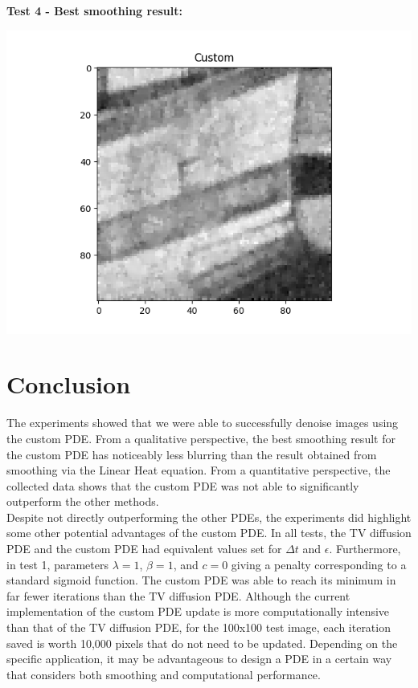 \documentclass{article}
\begin{document}
  \vspace{12 pt}
  \noindent \textbf{Test 4 - Best smoothing result:}
  \begin{center}
    \includegraphics[width=\textwidth]{../generated_images/Custom_test4.png}
  \end{center}


  \newpage
  \section{Conclusion}

  \noindent
  The experiments showed that we were able to successfully
  denoise images using the custom PDE. From a qualitative
  perspective, the best smoothing result for the custom PDE
  has noticeably less blurring than the result obtained from smoothing via
  the Linear Heat equation. From a quantitative perspective, the
  collected data shows that the custom PDE was not able to
  significantly outperform the other methods.\\

  \noindent
  Despite not directly outperforming the other PDEs, the experiments did highlight some
  other potential advantages of the custom PDE.
  In all tests, the TV diffusion PDE and the custom PDE had equivalent values set for
  $\Delta t$ and $\epsilon$. Furthermore, in test 1, parameters $\lambda = 1$, $\beta=1$,
  and $c=0$ giving a penalty corresponding to a standard sigmoid function. The custom
  PDE was able to reach its minimum in far fewer iterations than the TV diffusion PDE.
  Although the current implementation of the custom PDE update is more computationally
  intensive than that of the TV diffusion PDE, for the 100x100 test image,
  each iteration saved is worth 10,000 pixels that do not need to be updated. Depending on the specific
  application, it may be advantageous to design a PDE in a certain way
  that considers both smoothing and computational performance.\\
\end{document}
